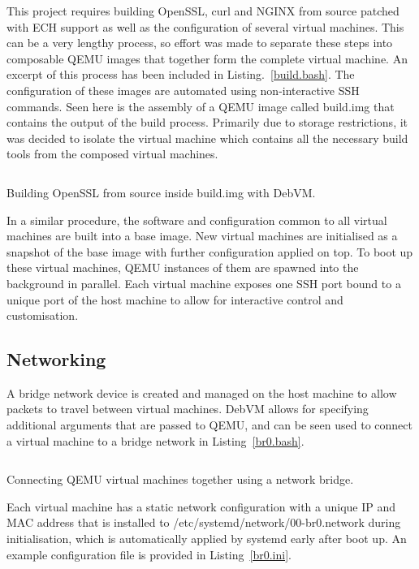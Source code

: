 This project requires building OpenSSL, curl and NGINX from source patched with ECH support as well as the configuration of several virtual machines. This can be a very lengthy process, so effort was made to separate these steps into composable QEMU images that together form the complete virtual machine. An excerpt of this process has been included in Listing.~\ref{build.bash}. The configuration of these images are automated using non-interactive SSH commands. Seen here is the assembly of a QEMU image called build.img that contains the output of the build process. Primarily due to storage restrictions, it was decided to isolate the virtual machine which contains all the necessary build tools from the composed virtual machines.

\begin{listing}[ht]
\inputminted{bash}{snippets/build.bash}
\caption[Building OpenSSL from source inside build.img with DebVM]{Building OpenSSL from source inside build.img with DebVM.}
\label{build.bash}
\end{listing}

In a similar procedure, the software and configuration common to all virtual machines are built into a base image. New virtual machines are initialised as a snapshot of the base image with further configuration applied on top. To boot up these virtual machines, QEMU instances of them are spawned into the background in parallel. Each virtual machine exposes one SSH port bound to a unique port of the host machine to allow for interactive control and customisation.

\subsection{Networking}

A bridge network device is created and managed on the host machine to allow packets to travel between virtual machines. DebVM allows for specifying additional arguments that are passed to QEMU, and can be seen used to connect a virtual machine to a bridge network in Listing~\ref{br0.bash}.

\begin{listing}[ht]
\inputminted{bash}{snippets/br0.bash}
\caption[Connecting QEMU virtual machines using a network bridge]{Connecting QEMU virtual machines together using a network bridge.}
\label{br0.bash}
\end{listing}

Each virtual machine has a static network configuration with a unique IP and MAC address that is installed to /etc/systemd/network/00-br0.network during initialisation, which is automatically applied by systemd early after boot up. An example configuration file is provided in Listing~\ref{br0.ini}.

